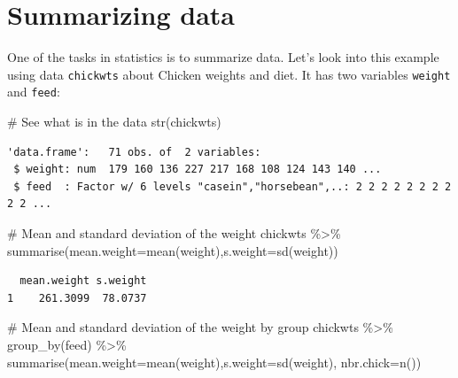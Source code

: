 \documentclass[
  letterpaper,
  DIV=11,
  numbers=noendperiod]{scrreprt}
\newenvironment{Shaded}{\begin{snugshade}}{\end{snugshade}}
\newcommand{\AttributeTok}[1]{\textcolor[rgb]{0.40,0.45,0.13}{#1}}
\newcommand{\CommentTok}[1]{\textcolor[rgb]{0.37,0.37,0.37}{#1}}
\newcommand{\FunctionTok}[1]{\textcolor[rgb]{0.28,0.35,0.67}{#1}}
\newcommand{\NormalTok}[1]{\textcolor[rgb]{0.00,0.23,0.31}{#1}}
\newcommand{\SpecialCharTok}[1]{\textcolor[rgb]{0.37,0.37,0.37}{#1}}
\begin{document}
\hypertarget{summarizing-data}{%
\section*{Summarizing data}\label{summarizing-data}}


One of the tasks in statistics is to summarize data. Let's look into
this example using data \texttt{chickwts} about Chicken weights and
diet. It has two variables \texttt{weight} and \texttt{feed}:

\begin{Shaded}
\begin{Highlighting}[]
\CommentTok{\# See what is in the data}
\FunctionTok{str}\NormalTok{(chickwts)}
\end{Highlighting}
\end{Shaded}

\begin{verbatim}
'data.frame':   71 obs. of  2 variables:
 $ weight: num  179 160 136 227 217 168 108 124 143 140 ...
 $ feed  : Factor w/ 6 levels "casein","horsebean",..: 2 2 2 2 2 2 2 2 2 2 ...
\end{verbatim}

\begin{Shaded}
\begin{Highlighting}[]
\CommentTok{\# Mean and standard deviation of the weight}
\NormalTok{chickwts }\SpecialCharTok{\%\textgreater{}\%} 
  \FunctionTok{summarise}\NormalTok{(}\AttributeTok{mean.weight=}\FunctionTok{mean}\NormalTok{(weight),}\AttributeTok{s.weight=}\FunctionTok{sd}\NormalTok{(weight))}
\end{Highlighting}
\end{Shaded}

\begin{verbatim}
  mean.weight s.weight
1    261.3099  78.0737
\end{verbatim}

\begin{Shaded}
\begin{Highlighting}[]
\CommentTok{\# Mean and standard deviation of the weight by group}
\NormalTok{chickwts }\SpecialCharTok{\%\textgreater{}\%} 
  \FunctionTok{group\_by}\NormalTok{(feed) }\SpecialCharTok{\%\textgreater{}\%} 
  \FunctionTok{summarise}\NormalTok{(}\AttributeTok{mean.weight=}\FunctionTok{mean}\NormalTok{(weight),}\AttributeTok{s.weight=}\FunctionTok{sd}\NormalTok{(weight), }\AttributeTok{nbr.chick=}\FunctionTok{n}\NormalTok{())}
\end{Highlighting}
\end{Shaded}
\end{document}
